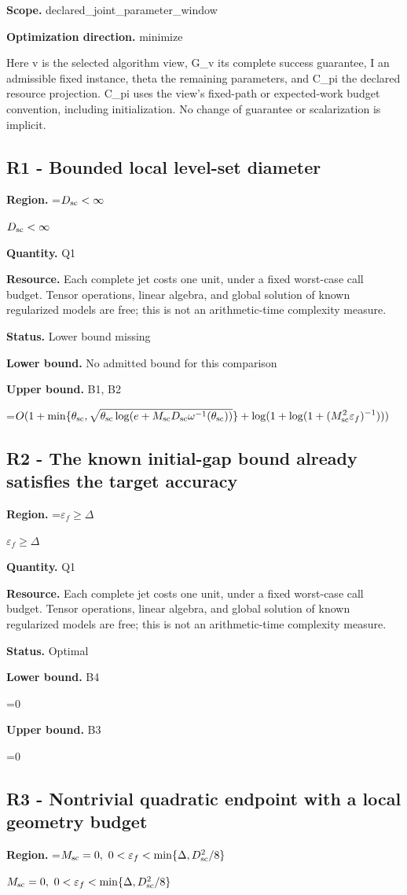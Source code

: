 \documentclass[10pt,a4paper]{article}
\newcommand{\AtlasMath}[1]{\par\begingroup\centering\setbox0=\hbox{$\displaystyle #1$}\ifdim\wd0>1.4\linewidth\typeout{ATLAS WIDE FORMULA: \the\wd0}\fi\ifdim\wd0>\linewidth\resizebox{\linewidth}{!}{\box0}\else\box0\fi\par\endgroup}
\newcommand{\AtlasInlineMath}[1]{\begingroup\setbox0=\hbox{$#1$}\ifdim\wd0>.4\linewidth\endgroup\AtlasMath{#1}\else\endgroup$#1$\fi}
\begin{document}
\textbf{Scope.} declared\_joint\_parameter\_window

\textbf{Optimization direction.} minimize

Here v is the selected algorithm view, G\_v its complete success guarantee, I an admissible fixed instance, theta the remaining parameters, and C\_pi the declared resource projection. C\_pi uses the view's fixed-path or expected-work budget convention, including initialization. No change of guarantee or scalarization is implicit.

\subsection{R1 - Bounded local level-set diameter}
\textbf{Region.} \AtlasInlineMath{D_{\rm sc}<\infty}

\textbf{Quantity.} Q1

\textbf{Resource.} Each complete jet costs one unit, under a fixed worst-case call budget. Tensor operations, linear algebra, and global solution of known regularized models are free; this is not an arithmetic-time complexity measure.

\textbf{Status.} Lower bound missing

\textbf{Lower bound.} No admitted bound for this comparison

\textbf{Upper bound.} B1, B2

\AtlasMath{O(1+\min\{\theta_{\rm sc},\sqrt{\theta_{\rm sc}\log(e+M_{\rm sc}D_{\rm sc}\omega^{-1}(\theta_{\rm sc}))}\}+\log(1+\log(1+(M_{\rm sc}^2\varepsilon_f)^{-1})))}
\subsection{R2 - The known initial-gap bound already satisfies the target accuracy}
\textbf{Region.} \AtlasInlineMath{\varepsilon_f\ge\Delta}

\textbf{Quantity.} Q1

\textbf{Resource.} Each complete jet costs one unit, under a fixed worst-case call budget. Tensor operations, linear algebra, and global solution of known regularized models are free; this is not an arithmetic-time complexity measure.

\textbf{Status.} Optimal

\textbf{Lower bound.} B4

\AtlasMath{0}
\textbf{Upper bound.} B3

\AtlasMath{0}
\subsection{R3 - Nontrivial quadratic endpoint with a local geometry budget}
\textbf{Region.} \AtlasInlineMath{M_{\rm sc}=0,\ 0<\varepsilon_f<\min\{\Delta,D_{\rm sc}^2/8\}}
\end{document}
